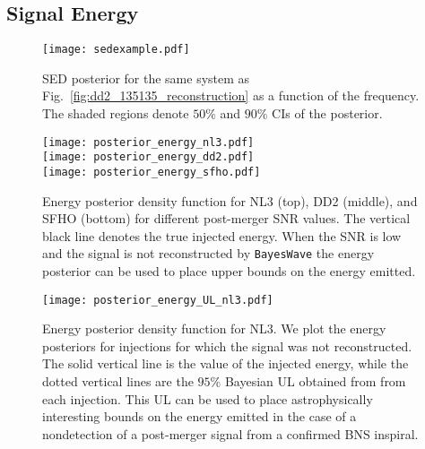 \documentclass[aps,prd,amsmath,floats,floatfix, twocolumn,
superscriptaddress,nofootinbib,showpacs]{revtex4-1}
\begin{document}
\subsection{Signal Energy}
\label{sec:energy}
%
\begin{figure}[h!]
\texttt{[image: sedexample.pdf]}
 \caption{\label{fig:sedexample}SED posterior for the same system as Fig.~\ref{fig:dd2_135135_reconstruction} as a function of the frequency. The shaded regions denote $50\%$ and $90\%$ CIs of the posterior.}
\end{figure}
%

%
\begin{figure}[h!]
\texttt{[image: posterior\_energy\_nl3.pdf]}\\
\texttt{[image: posterior\_energy\_dd2.pdf]}\\
\texttt{[image: posterior\_energy\_sfho.pdf]}
\caption{\label{fig:energyposteriors} Energy  posterior density function for NL3 (top), DD2 (middle), and SFHO (bottom) for different post-merger SNR values. The vertical black line denotes the true injected energy. When the SNR is low and the signal is not reconstructed by {\tt BayesWave} the energy posterior can be used to place upper bounds on the energy emitted.}
\end{figure}
%

%
\begin{figure}[h!]
\texttt{[image: posterior\_energy\_UL\_nl3.pdf]}
\caption{\label{fig:energyposteriors_UL} Energy  posterior density function for NL3. We plot the energy posteriors for injections for which the signal was not reconstructed. The solid vertical line is the value of the injected energy, while the dotted vertical lines are the $95\%$ Bayesian UL obtained from from each injection. This UL can be used to place astrophysically interesting bounds on the energy emitted in the case of a nondetection of a post-merger signal from a confirmed BNS inspiral.}
\end{figure}
%
\end{document}
